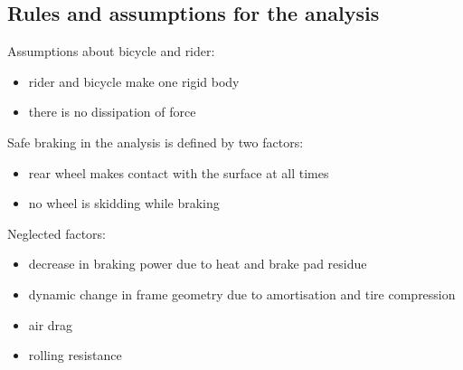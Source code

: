 \documentclass[12pt, a4]{article}
\begin{document}
\subsection{Rules and assumptions for the analysis}\label{theory_rules}
Assumptions about bicycle and rider:
\begin{itemize}
\item{rider and bicycle make one rigid body}
\item{there is no dissipation of force}
\end{itemize}
Safe braking in the analysis is defined by two factors:
\begin{itemize}
\item{rear wheel makes contact with the surface at all times}
\item{no wheel is skidding while braking}
\end{itemize}
Neglected factors:
\begin{itemize}
\item{decrease in braking power due to heat and brake pad residue}
\item{dynamic change in frame geometry due to amortisation and tire compression}
\item{air drag}
\item{rolling resistance}
\end{itemize}
\end{document}
